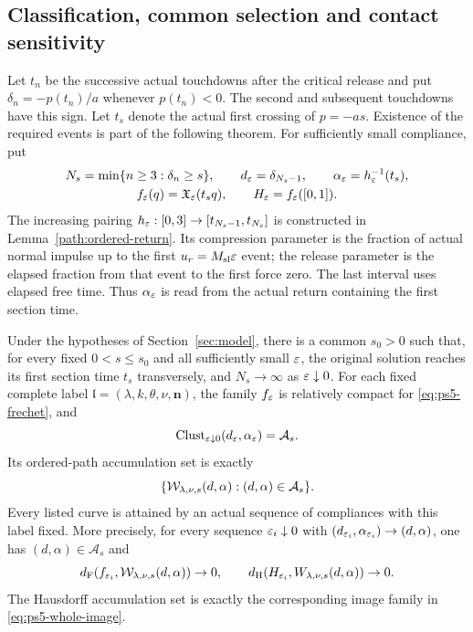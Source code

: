 \subsection{Classification, common selection and contact sensitivity}
Let $t_n$ be the successive actual touchdowns after the critical
release and put $\delta_n=-p(t_n)/a$ whenever $p(t_n)<0$. The second
and subsequent touchdowns have this sign. Let $t_s$ denote the
actual first crossing of $p=-as$. Existence of the required events
is part of the following theorem. For sufficiently small compliance,
put
\begin{equation}
 \begin{gathered}
 N_s=\min\{n\ge3:\delta_n\ge s\},\qquad
 d_\varepsilon=\delta_{N_s-1},\qquad
 \alpha_\varepsilon=h_\varepsilon^{-1}(t_s),\\
 f_\varepsilon(q)=\mathfrak X_\varepsilon(t_s q),\qquad H_\varepsilon=f_\varepsilon([0,1]).
 \end{gathered}
 \label{eq:ps5-stop}
\end{equation}
The increasing pairing $h_\varepsilon:[0,3]\to[t_{N_s-1},t_{N_s}]$
is constructed in Lemma~\ref{path:ordered-return}. Its compression
parameter is the fraction of actual normal impulse up to the first
$u_r=M_{\rm sl}\varepsilon$ event; the release parameter is the elapsed fraction
from that event to the first force zero. The last interval uses
elapsed free time. Thus $\alpha_\varepsilon$ is read from the actual return
containing the first section time.

\begingroup
\renewcommand{\thetheorem}{A}
\begin{theorem}
\label{thm:whole}
Under the hypotheses of Section~\ref{sec:model}, there is a common
$s_0>0$ such that, for every fixed $0<s\le s_0$ and all sufficiently
small $\varepsilon$, the original solution reaches its first section time
$t_s$ transversely, and $N_s\to\infty$ as $\varepsilon\downarrow0$.
For each fixed
complete label $\mathfrak l=(\lambda,k,\theta,\nu,\mathbf n)$, the
family $f_\varepsilon$ is relatively compact for \eqref{eq:ps5-frechet},
and
\[
 \operatorname{Clust}_{\varepsilon\downarrow0}(d_\varepsilon,\alpha_\varepsilon)=\mathcal A_s.
\]
Its ordered-path accumulation set is exactly
\[
 \{\mathcal W_{\lambda,\nu,s}(d,\alpha):(d,\alpha)\in\mathcal A_s\}.
\]
Every listed curve is attained by an actual sequence of compliances
with this label fixed. More precisely, for every sequence $\varepsilon_i\downarrow0$ with
$(d_{\varepsilon_i},\alpha_{\varepsilon_i})\to(d,\alpha)$, one has
$(d,\alpha)\in\mathcal A_s$ and
\begin{equation}
 d_{\mathrm F}(f_{\varepsilon_i},\mathcal W_{\lambda,\nu,s}(d,\alpha))\to0,\qquad
 d_{\mathrm H}(H_{\varepsilon_i},W_{\lambda,\nu,s}(d,\alpha))\to0.
 \label{eq:ps5-whole-limit}
\end{equation}
The Hausdorff accumulation set is exactly the corresponding image
family in \eqref{eq:ps5-whole-image}.
\end{theorem}
\endgroup

